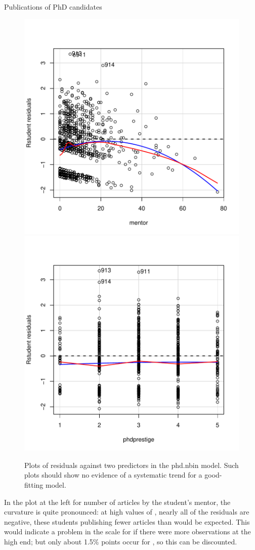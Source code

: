 \documentclass[11pt]{book}\usepackage[]{graphicx}\usepackage[]{color}
\newenvironment{knitrout}{}{} %
\renewenvironment{knitrout}{\small\renewcommand{\baselinestretch}{.85}}{} %
\begin{document}
\begin{Example}[phdpubs5]{Publications of PhD candidates}
\begin{knitrout}
\begin{figure}[!htbp]
\centerline{\includegraphics[width=.5\textwidth]{ch09/fig/phdpubs5-resplot2-1} 
\includegraphics[width=.5\textwidth]{ch09/fig/phdpubs5-resplot2-2} }

\caption[Plots of residuals against two predictors in the phd]{Plots of residuals against two predictors in the phd.nbin model. Such plots should show no evidence of a systematic trend for a good-fitting model.\label{fig:phdpubs5-resplot2}}
\end{figure}


\end{knitrout}
In the plot at the left for number of articles by the student's mentor, the curvature is quite pronounced: at high values of
, nearly all of the residuals are negative, these students publishing fewer articles than
would be expected. This would indicate a problem in the scale for 
if there were more observations at the high end;  but only about 1.5\% points occur for ,
so this can be discounted.


\end{Example}
\end{document}
